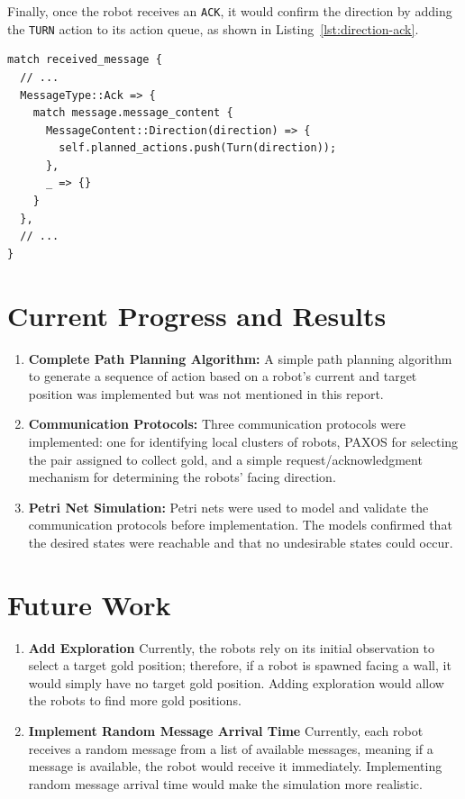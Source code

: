 \documentclass[12pt,a4paper]{article}
\begin{document}
Finally, once the robot receives an \texttt{ACK}, it would confirm the direction by adding the \texttt{TURN} action to its action queue, as shown in Listing~\ref{lst:direction-ack}.

\begin{lstlisting}[float, caption={Robot Receives \texttt{ACK}}, label={lst:direction-ack}]
match received_message {
  // ...
  MessageType::Ack => {
    match message.message_content {
      MessageContent::Direction(direction) => {
        self.planned_actions.push(Turn(direction));
      },
      _ => {}
    }
  },
  // ...
}
\end{lstlisting}
 
\section{Current Progress and Results}
\begin{enumerate}
    \item \textbf{Complete Path Planning Algorithm:} A simple path planning algorithm to generate a sequence of action based on a robot's current and target position was implemented but was not mentioned in this report.
    \item \textbf{Communication Protocols:} Three communication protocols were implemented: one for identifying local clusters of robots, PAXOS for selecting the pair assigned to collect gold, and a simple request/acknowledgment mechanism for determining the robots’ facing direction.
    \item \textbf{Petri Net Simulation:} Petri nets were used to model and validate the communication protocols before implementation. The models confirmed that the desired states were reachable and that no undesirable states could occur.
\end{enumerate}

\section{Future Work}
\begin{enumerate}
    \item \textbf{Add Exploration} Currently, the robots rely on its initial observation to select a target gold position; therefore, if a robot is spawned facing a wall, it would simply have no target gold position. Adding exploration would allow the robots to find more gold positions.
    \item \textbf{Implement Random Message Arrival Time} Currently, each robot receives a random message from a list of available messages, meaning if a message is available, the robot would receive it immediately. Implementing random message arrival time would make the simulation more realistic.
\end{enumerate}
\end{document}
